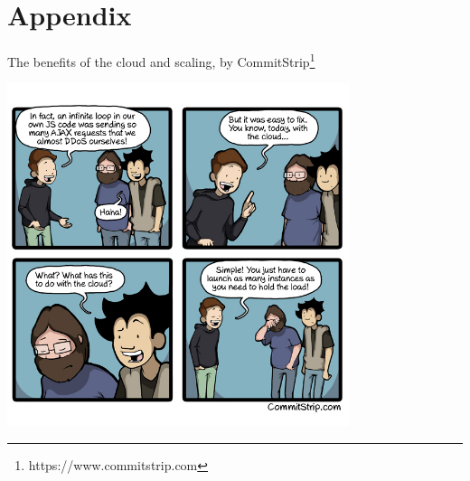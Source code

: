 \documentclass[a4paper,11pt]{exam}
\begin{document}
\section{Appendix}

The benefits of the cloud and scaling, by CommitStrip\footnote{https://www.commitstrip.com}
\begin{center}
	\includegraphics[width=10cm]{fig/commitstripcloudscale.jpg}	
\end{center}
\end{document}
